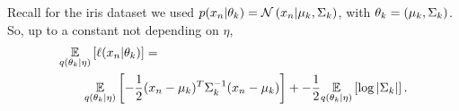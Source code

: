 \begin{ex}
%
Recall for the iris dataset we used $p(x_n \vert \theta_k) = \mathcal{N}\left(x_n \vert
\mu_k, \Sigma_k\right)$, with $\theta_k = (\mu_k, \Sigma_k)$.  So,
up to a constant not depending on $\eta$,
%
\begin{align*}
%
\MoveEqLeft
\expect{\q(\theta_\k \vert \eta)}{\logp(\x_\n \vert \theta_\k)} =\\
&
\expect{\q(\theta_\k \vert \eta)}{
-\frac{1}{2}(\x_n - \mu_k)^T \Sigma_\k^{-1} (\x_n - \mu_k)} +
-\frac{1}{2} \expect{\q(\theta_\k \vert \eta)}{\log |\Sigma_\k|}.
%
\end{align*}
%
%
\end{ex}
